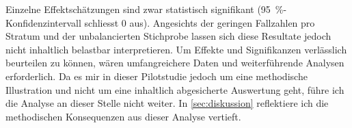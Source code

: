 Einzelne Effektschätzungen sind zwar statistisch signifikant (\SI{95}{\percent}-Konfidenzintervall schliesst 0 aus). Angesichts der geringen Fallzahlen pro Stratum und der unbalancierten Stichprobe lassen sich diese Resultate jedoch nicht inhaltlich belastbar interpretieren. Um Effekte und Signifikanzen verlässlich beurteilen zu können, wären umfangreichere Daten und weiterführende Analysen erforderlich. Da es mir in dieser Pilotstudie jedoch um eine methodische Illustration und nicht um eine inhaltlich abgesicherte Auswertung geht, führe ich die Analyse an dieser Stelle nicht weiter. In \cref{sec:diskussion} reflektiere ich die methodischen Konsequenzen aus dieser Analyse vertieft.

